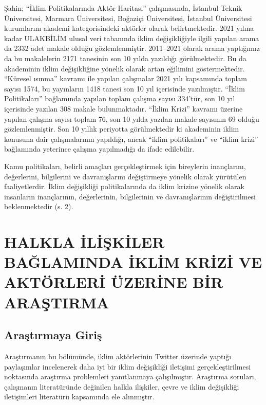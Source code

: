 \documentclass[
]{book}
\begin{document}
Şahin; ``İklim Politikalarında Aktör Haritası'' çalışmasında, İstanbul Teknik Üniversitesi, Marmara Üniversitesi, Boğaziçi Üniversitesi, İstanbul Üniversitesi kurumlarını akademi kategorisindeki aktörler olarak belirtmektedir. 2021 yılına kadar ULAKBİLİM ulusal veri tabanında iklim değişikliğiyle ilgili yapılan arama da 2332 adet makale olduğu gözlemlenmiştir. 2011--2021 olarak arama yaptığımız da bu makalelerin 2171 tanesinin son 10 yılda yazıldığı görülmektedir. Bu da akademinin iklim değişikliğine yönelik olarak artan eğilimini göstermektedir. ``Küresel ısınma'' kavramı ile yapılan çalışmalar 2021 yılı kapsamında toplam sayısı 1574, bu yayınların 1418 tanesi son 10 yıl içerisinde yazılmıştır. ``İklim Politikaları'' bağlamında yapılan toplam çalışma sayısı 334'tür, son 10 yıl içerisinde yazılan 308 makale bulunmaktadır. ``İklim Krizi'' kavramı üzerine yapılan çalışma sayısı toplam 76, son 10 yılda yazılan makale sayısının 69 olduğu gözlemlenmiştir. Son 10 yıllık periyotta görülmektedir ki akademinin iklim konusuna dair çalışmalarının yapıldığı, ancak ``iklim politikaları'' ve ``iklim krizi'' bağlamında yeterince çalışma yapılmadığı da ifade edilebilir.

Kamu politikaları, belirli amaçları gerçekleştirmek için bireylerin inançlarını, değerlerini, bilgilerini ve davranışlarını değiştirmeye yönelik olarak yürütülen faaliyetlerdir. İklim değişikliği politikalarında da iklim krizine yönelik olarak insanların inançlarının, değerlerinin, bilgilerinin ve davranışlarının değiştirilmesi beklenmektedir (s. 2). \citep{demirci2016islevsel}

\hypertarget{halkla-iliux15fkiler-baux11flaminda-iklim-krizi-ve-aktuxf6rleri-uxfczerine-bir-araux15ftirma}{%
\chapter{HALKLA İLİŞKİLER BAĞLAMINDA İKLİM KRİZİ VE AKTÖRLERİ ÜZERİNE BİR ARAŞTIRMA}\label{halkla-iliux15fkiler-baux11flaminda-iklim-krizi-ve-aktuxf6rleri-uxfczerine-bir-araux15ftirma}}

\hypertarget{araux15ftux131rmaya-giriux15f}{%
\section{Araştırmaya Giriş}\label{araux15ftux131rmaya-giriux15f}}

Araştırmanın bu bölümünde, iklim aktörlerinin Twitter üzerinde yaptığı paylaşımlar incelenerek daha iyi bir iklim değişikliği iletişimi gerçekleştirilmesi noktasında araştırma problemleri yanıtlanmaya çalışılmıştır. Araştırma soruları, çalışmanın literatüründe değinilen halkla ilişkiler, çevre ve iklim değişikliği iletişimleri literatürü kapsamında ele alınmıştır.
\end{document}

